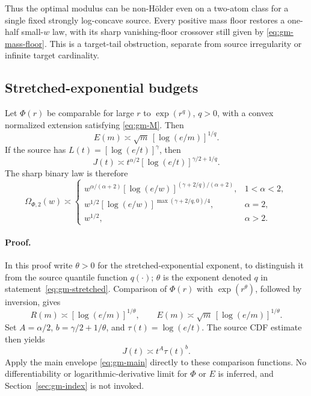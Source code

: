 Thus the optimal modulus can be non-H\"older even on a two-atom class for a single fixed strongly log-concave source. Every positive mass floor restores a one-half small-\(w\) law, with its sharp vanishing-floor crossover still given by \eqref{eq:gm-mass-floor}. This is a target-tail obstruction, separate from source irregularity or infinite target cardinality.

\subsection{Stretched-exponential budgets}\label{sec:gm-stretched}

Let \(\Phi(r)\) be comparable for large \(r\) to \(\exp(r^q)\), \(q>0\), with a convex normalized extension satisfying \eqref{eq:gm-M}. Then
\[
 E(m)\asymp\sqrt m\,[\log(e/m)]^{1/q}.
\]
If the source has \(L(t)=[\log(e/t)]^\gamma\), then
\[
 J(t)\asymp t^{\alpha/2}[\log(e/t)]^{\gamma/2+1/q}.
\]
The sharp binary law is therefore
\begin{equation}
 \Omega_{\Phi,2}(w)\asymp
 \begin{cases}
 w^{\alpha/(\alpha+2)}
 [\log(e/w)]^{(\gamma+2/q)/(\alpha+2)},&1<\alpha<2,\\[3pt]
 w^{1/2}[\log(e/w)]^{\max(\gamma+2/q,0)/4},&\alpha=2,\\[3pt]
 w^{1/2},&\alpha>2.
 \end{cases}
 \tag{7.2}\label{eq:gm-stretched}
\end{equation}
\paragraph{Proof.}
In this proof write \(\theta>0\) for the stretched-exponential exponent, to distinguish it from the source quantile function \(q(\cdot)\); \(\theta\) is the exponent denoted \(q\) in statement~\eqref{eq:gm-stretched}. Comparison of \(\Phi(r)\) with \(\exp(r^\theta)\), followed by inversion, gives
\[
 R(m)\asymp[\log(e/m)]^{1/\theta},\qquad
 E(m)\asymp\sqrt m\,[\log(e/m)]^{1/\theta}.
\]
Set \(A=\alpha/2\), \(b=\gamma/2+1/\theta\), and \(\tau(t)=\log(e/t)\). The source CDF estimate then yields
\[
 J(t)\asymp t^A\tau(t)^b.
\]
Apply the main envelope \eqref{eq:gm-main} directly to these comparison functions. No differentiability or logarithmic-derivative limit for \(\Phi\) or \(E\) is inferred, and Section~\ref{sec:gm-index} is not invoked.

